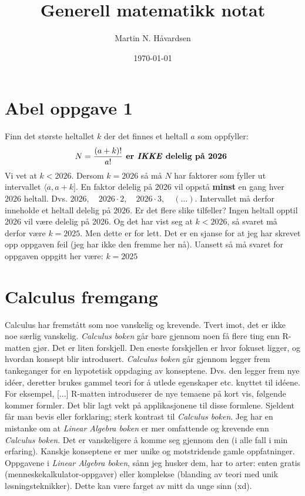 \documentclass{article}
\title{Generell matematikk notat}
\author{Martin N. Håvardsen}
\date{\today}
\numberwithin{equation}{section}
\begin{document}
\maketitle

\section{Abel oppgave 1}
Finn det største heltallet $k$ der det finnes et heltall $a$ som oppfyller:
\begin{align}
  N=\displaystyle\frac{(a+k)!}{a !} \textbf{ er \textit{IKKE} delelig på 2026 }
\end{align}
Vi vet at $k<2026$. Dersom $k=2026$ så må $N$ har faktorer som fyller ut intervallet $\langle a, a+k]$. En faktor delelig på $2026$ vil oppstå \textbf{minst} en gang hver $2026$ heltall. Dvs. $2026,\quad 2026\cdot 2,\quad 2026\cdot 3, \quad (\dots)$\;. Intervallet må derfor inneholde et heltall delelig på $2026$. \newline
Er det flere slike tilfeller? Ingen heltall opptil 2026 vil være delelig på 2026. Og det har vist seg at $k<2026$, så svaret må derfor være $k=2025$. Men dette er for lett. Det er en sjanse for at jeg har skrevet opp oppgaven feil (jeg har ikke den fremme her nå). Uansett så må svaret for oppgaven oppgitt her være: $k=2025$
\section{Calculus fremgang}
Calculus har fremstått som noe vanskelig og krevende. Tvert imot, det er ikke noe særlig vanskelig. \textit{Calculus boken} går bare gjennom noen få flere ting enn R-matten gjør. Det er liten forskjell. Den eneste forskjellen er hvor fokuset ligger, og hvordan konsept blir introdusert. \newline
\textit{Calculus boken} går gjennom legger frem tankeganger for en hypotetisk oppdaging av konseptene. Dvs. den legger frem nye idéer, deretter brukes gammel teori for å utlede egenskaper etc. knyttet til idéene. For eksempel, [...] \newline
R-matten introduserer de nye temaene på kort vis, følgende kommer formler. Det blir lagt vekt på applikasjonene til disse formlene. Sjeldent får man bevis eller forklaring; sterk kontrast til \textit{Calculus boken}. \newline
Jeg har en mistanke om at \textit{Linear Algebra boken} er mer omfattende og krevende enn \textit{Calculus boken}. Det er vanskeligere å komme seg gjennom den (i alle fall i min erfaring). Kanskje konseptene er mer unike og motstridende gamle oppfatninger. Oppgavene i \textit{Linear Algebra boken}, sånn jeg husker dem, har to arter: enten gratis (menneskekalkulator-oppgaver) eller komplekse (blanding av teori med unik løsningsteknikker). Dette kan være farget av mitt da unge sinn (xd).\newline
\end{document}
